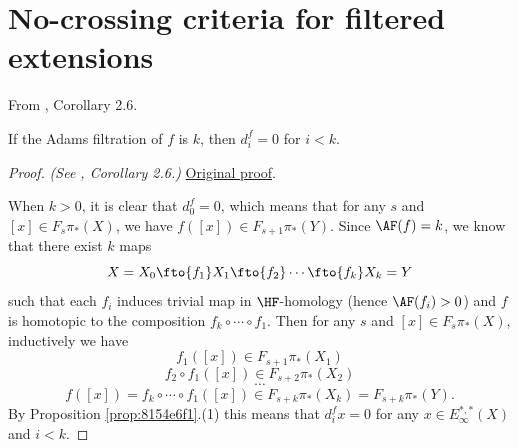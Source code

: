 \section{No-crossing criteria for filtered extensions}

\begin{corollary}
\label{paper:2.6}
From \cite{LWX126}, Corollary 2.6.\par
If the Adams filtration of $f$ is $k$, then
    $d^f_i=0$ for $i<k$.



\end{corollary}
\begin{proof}
\textit{(See \cite{LWX126}, Corollary 2.6.)} \href{paper/main.tex.html#L332}{Original proof}.

When $k>0$, it is clear that $d^f_0=0$, which means that for any $s$ and $[x]\in F_s\pi_*(X)$, we have $f([x])\in F_{s+1}\pi_*(Y)$. Since $\AF(f)=k$, we know that there exist $k$ maps
    $$X=X_0\fto{f_1}X_1\fto{f_2}\cdots\fto{f_k}X_k=Y$$
    such that each $f_i$ induces trivial map in $\HF$-homology (hence $\AF(f_i)>0$) and $f$ is homotopic to the composition $f_k\circ \cdots\circ f_1.$
    Then for any $s$ and $[x]\in F_s\pi_*(X)$, inductively we have
    $$f_1([x])\in F_{s+1}\pi_*(X_1)$$
    $$f_2\circ f_1([x])\in F_{s+2}\pi_*(X_2)$$
    $$\cdots$$
    $$f([x])=f_k\circ\cdots\circ f_1([x])\in F_{s+k}\pi_*(X_k)=F_{s+k}\pi_*(Y).$$
    By Proposition \ref{prop:8154e6f1}.(1) this means that $d_i^fx=0$ for any $x\in E_\infty^{*,*}(X)$ and $i<k$.
\end{proof}

